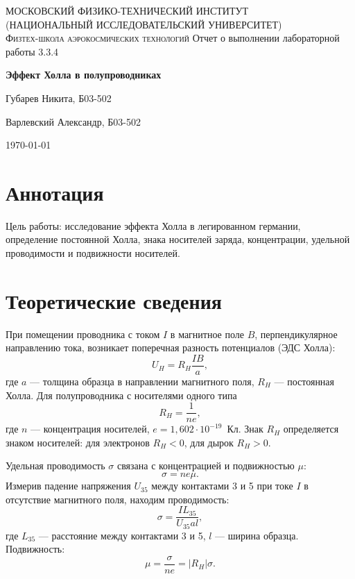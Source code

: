 \documentclass[a4paper,12pt]{article}
\begin{document}
\begin{titlepage}
    \centering
    {\scshape\Large МОСКОВСКИЙ ФИЗИКО-ТЕХНИЧЕСКИЙ ИНСТИТУТ \\
    (НАЦИОНАЛЬНЫЙ ИССЛЕДОВАТЕЛЬСКИЙ УНИВЕРСИТЕТ)\\
    Физтех-школа аэрокосмических технологий}
    \vspace{4cm}
    {\LARGE Отчет о выполнении лабораторной работы 3.3.4}
    \vspace{1cm}
    
    
    {\huge\bf Эффект Холла в полупроводниках}
    \vfill
    \begin{flushright}
        {\LARGE Губарев Никита, Б03-502}
        
        {\LARGE Варлевский Александр, Б03-502}
    \end{flushright}
    \vfill
    \today
\end{titlepage}

\tableofcontents
\newpage

\section{Аннотация}
Цель работы: исследование эффекта Холла в легированном германии, определение постоянной Холла, знака носителей заряда, концентрации, удельной проводимости и подвижности носителей.

\section{Теоретические сведения}
При помещении проводника с током \(I\) в магнитное поле \(B\), перпендикулярное направлению тока, возникает поперечная разность потенциалов (ЭДС Холла):
\begin{equation}
    U_H = R_H \frac{I B}{a},
    \label{eq:hall}
\end{equation}
где \(a\) --- толщина образца в направлении магнитного поля, \(R_H\) --- постоянная Холла. Для полупроводника с носителями одного типа
\begin{equation}
    R_H = \frac{1}{n e},
    \label{eq:RH}
\end{equation}
где \(n\) --- концентрация носителей, \(e = 1{,}602\cdot10^{-19}\)~Кл. Знак \(R_H\) определяется знаком носителей: для электронов \(R_H < 0\), для дырок \(R_H > 0\).

Удельная проводимость \(\sigma\) связана с концентрацией и подвижностью \(\mu\):
\begin{equation}
    \sigma = n e \mu.
    \label{eq:sigma}
\end{equation}
Измерив падение напряжения \(U_{35}\) между контактами 3 и 5 при токе \(I\) в отсутствие магнитного поля, находим проводимость:
\begin{equation}
    \sigma = \frac{I L_{35}}{U_{35} a l},
    \label{eq:cond}
\end{equation}
где \(L_{35}\) --- расстояние между контактами 3 и 5, \(l\) --- ширина образца. Подвижность:
\begin{equation}
    \mu = \frac{\sigma}{n e} = |R_H| \sigma.
    \label{eq:mu}
\end{equation}
\end{document}
